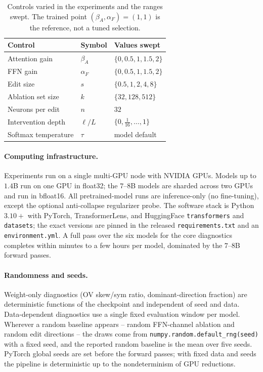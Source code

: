 \documentclass[11pt]{article}
\begin{document}
\begin{table}[t]\centering\small
\caption{Controls varied in the experiments and the ranges swept. The trained point
$(\beta_A,\alpha_F){=}(1,1)$ is the reference, not a tuned selection.}
\label{tab:hparams}
\begin{tabular}{@{}lll@{}}
\toprule
Control & Symbol & Values swept \\
\midrule
Attention gain      & $\beta_A$   & $\{0,0.5,1,1.5,2\}$ \\
FFN gain            & $\alpha_F$  & $\{0,0.5,1,1.5,2\}$ \\
Edit size           & $s$         & $\{0.5,1,2,4,8\}$ \\
Ablation set size   & $k$         & $\{32,128,512\}$ \\
Neurons per edit    & $n$         & $32$ \\
Intervention depth  & $\ell/L$    & $\{0,\tfrac1{16},\dots,1\}$ \\
Softmax temperature & $\tau$      & model default \\
\bottomrule
\end{tabular}
\end{table}

\paragraph{Computing infrastructure.}
Experiments run on a single multi-GPU node with NVIDIA GPUs. Models up to
$1.4$B run on one GPU in float32; the $7$--$8$B models are sharded across two GPUs
and run in bfloat16. All pretrained-model runs are inference-only (no fine-tuning),
except the optional anti-collapse regularizer probe. The software stack is
Python~$3.10{+}$ with PyTorch, TransformerLens, and HuggingFace
\texttt{transformers} and \texttt{datasets}; the exact versions are pinned in the
released \texttt{requirements.txt} and an \texttt{environment.yml}. A full pass over
the six models for the core diagnostics completes within minutes to a few hours per
model, dominated by the $7$--$8$B forward passes.

\paragraph{Randomness and seeds.}
Weight-only diagnostics (OV skew/sym ratio, dominant-direction fraction) are
deterministic functions of the checkpoint and independent of seed and data.
Data-dependent diagnostics use a single fixed evaluation window per model. Wherever a
random baseline appears -- random FFN-channel ablation and random edit
directions -- the draws come from \texttt{numpy.random.\allowbreak default\_rng(seed)} with a fixed
seed, and the reported random baseline is the mean over five seeds. PyTorch global
seeds are set before the forward passes; with fixed data and seeds the pipeline is
deterministic up to the nondeterminism of GPU reductions.
\end{document}
